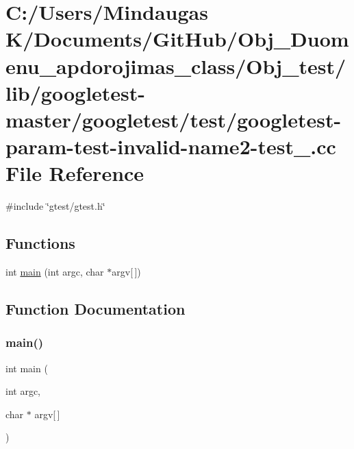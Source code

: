 \hypertarget{_obj__test_2lib_2googletest-master_2googletest_2test_2googletest-param-test-invalid-name2-test___8cc}{}\section{C\+:/\+Users/\+Mindaugas K/\+Documents/\+Git\+Hub/\+Obj\+\_\+\+Duomenu\+\_\+apdorojimas\+\_\+class/\+Obj\+\_\+test/lib/googletest-\/master/googletest/test/googletest-\/param-\/test-\/invalid-\/name2-\/test\+\_\+.cc File Reference}
\label{_obj__test_2lib_2googletest-master_2googletest_2test_2googletest-param-test-invalid-name2-test___8cc}
{\ttfamily \#include \char`\"{}gtest/gtest.\+h\char`\"{}}\newline
\subsection*{Functions}
\begin{DoxyCompactItemize}
\item 
int \mbox{\hyperlink{_obj__test_2lib_2googletest-master_2googletest_2test_2googletest-param-test-invalid-name2-test___8cc_a0ddf1224851353fc92bfbff6f499fa97}{main}} (int argc, char $\ast$argv\mbox{[}$\,$\mbox{]})
\end{DoxyCompactItemize}


\subsection{Function Documentation}
\mbox{\label{_obj__test_2lib_2googletest-master_2googletest_2test_2googletest-param-test-invalid-name2-test___8cc_a0ddf1224851353fc92bfbff6f499fa97}} 
\subsubsection{\texorpdfstring{main()}{main()}}
{\footnotesize\ttfamily int main (\begin{DoxyParamCaption}\item[{int}]{argc,  }\item[{char $\ast$}]{argv\mbox{[}$\,$\mbox{]} }\end{DoxyParamCaption})}

